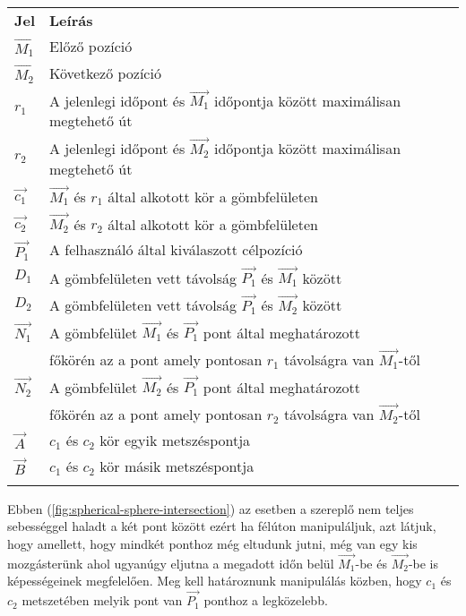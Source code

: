 \begin{tabular}{@{}ll@{}}
	\textbf{Jel} & \textbf{Leírás} \\
	$\overrightarrow{M_1}$ & Előző pozíció \\
	$\overrightarrow{M_2}$ & Következő pozíció \\
	$r_1$ & A jelenlegi időpont és $\overrightarrow{M_1}$ időpontja között maximálisan megtehető út \\
	$r_2$ & A jelenlegi időpont és $\overrightarrow{M_2}$ időpontja között maximálisan megtehető út \\
	$\overrightarrow{c_1}$ & $\overrightarrow{M_1}$ és $r_1$ által alkotott kör a gömbfelületen \\
	$\overrightarrow{c_2}$ & $\overrightarrow{M_2}$ és $r_2$ által alkotott kör a gömbfelületen \\
	$\overrightarrow{P_1}$ & A felhasználó által kiválaszott célpozíció \\
	$D_1$ & A gömbfelületen vett távolság $\overrightarrow{P_1}$ és $\overrightarrow{M_1}$ között \\
	$D_2$ & A gömbfelületen vett távolság $\overrightarrow{P_1}$ és $\overrightarrow{M_2}$ között \\
	$\overrightarrow{N_1}$ & A gömbfelület $\overrightarrow{M_1}$ és $\overrightarrow{P_1}$ pont által meghatározott \\
	& főkörén az a pont amely pontosan $r_1$ távolságra van $\overrightarrow{M_1}$-től \\
	$\overrightarrow{N_2}$ & A gömbfelület $\overrightarrow{M_2}$ és $\overrightarrow{P_1}$ pont által meghatározott \\
	& főkörén az a pont amely pontosan $r_2$ távolságra van $\overrightarrow{M_2}$-től \\
	$\overrightarrow{A}$ & $c_1$ és $c_2$ kör egyik metszéspontja \\
	$\overrightarrow{B}$ & $c_1$ és $c_2$ kör másik metszéspontja \\
	& \\
\end{tabular}

Ebben (\ref{fig:spherical-sphere-intersection}) az esetben a szereplő nem teljes sebességgel haladt a két pont között ezért ha félúton manipuláljuk, azt látjuk, hogy amellett, hogy mindkét ponthoz még eltudunk jutni, még van egy kis mozgásterünk ahol ugyanúgy eljutna a megadott időn belül $\overrightarrow{M_1}$-be és $\overrightarrow{M_2}$-be is képességeinek megfelelően. Meg kell határoznunk manipulálás közben, hogy $c_1$ és $c_2$ metszetében melyik pont van $\overrightarrow{P_1}$ ponthoz a legközelebb.

